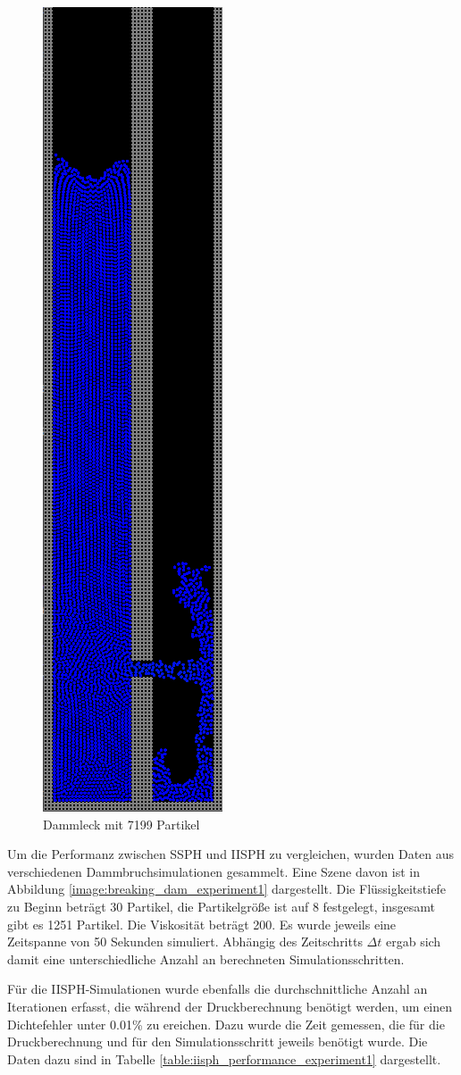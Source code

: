 \documentclass[11pt,
a4paper,
parskip=half, %
BCOR=10mm, %
english,
ngerman]{scrreprt}
\begin{document}
\begin{figure}[htb]
\begin{minipage}[t]{0.45\linewidth}
        \includegraphics[width=0.3\linewidth]{Dammleck_Experiment2.png}
        \caption{Dammleck mit 7199 Partikel}
        \label{image:leaky_dam_experiment2}
    \end{minipage}
\end{figure}

Um die Performanz zwischen SSPH und IISPH zu vergleichen, wurden Daten aus verschiedenen Dammbruchsimulationen gesammelt.
Eine Szene davon ist in Abbildung \ref{image:breaking_dam_experiment1} dargestellt.
Die Flüssigkeitstiefe zu Beginn beträgt 30 Partikel, die Partikelgröße ist auf 8 festgelegt, insgesamt gibt es 1251 Partikel.
Die Viskosität beträgt 200.
Es wurde jeweils eine Zeitspanne von 50 Sekunden simuliert. 
Abhängig des Zeitschritts $\Delta t$ ergab sich damit eine unterschiedliche Anzahl an berechneten Simulationsschritten.

Für die IISPH-Simulationen wurde ebenfalls die durchschnittliche Anzahl an Iterationen erfasst,
die während der Druckberechnung benötigt werden, um einen Dichtefehler unter 0.01\% zu ereichen.
Dazu wurde die Zeit gemessen, die für die Druckberechnung und für den Simulationsschritt jeweils benötigt wurde.
Die Daten dazu sind in Tabelle \ref{table:iisph_performance_experiment1} dargestellt.
\end{document}
